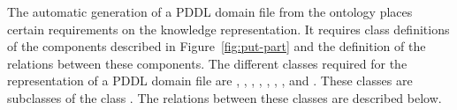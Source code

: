 The automatic generation of a PDDL domain file from the ontology places
certain requirements on the knowledge representation.
It requires class
definitions of the components described in Figure~\ref{fig:put-part} and the
definition of the relations between these components. The different classes
required for the representation of a PDDL domain file are ,
, , , ,
, , and . These
classes are subclasses of the class . The relations between
these classes are described below.

